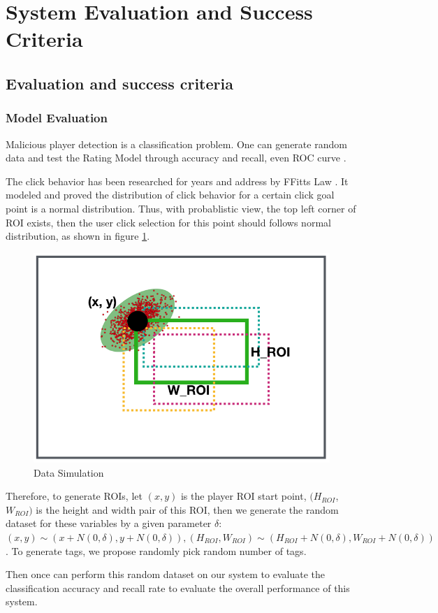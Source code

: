 \section{System Evaluation and Success Criteria}

\subsection{Evaluation and success criteria}
  \subsubsection{Model Evaluation}

  Malicious player detection is a classification problem. 
  One can generate random data and test the Rating Model through accuracy and recall, even ROC curve \cite{hanley1982meaning}.

  The click behavior has been researched for years and address by FFitts Law \cite{bi2013ffitts}.
  It modeled and proved the distribution of click behavior for a certain click goal point is a normal distribution.
  Thus, with probablistic view, the top left corner of ROI exists, then the user click selection 
  for this point should follows normal distribution, as shown in figure \ref{fig:evaluation}.

  \begin{figure}[htp]
  \centering
  \includegraphics[width=0.5\columnwidth]{figures/evaluation}
  \caption{Data Simulation}
  \label{fig:evaluation}
  \end{figure}

  Therefore, to generate ROIs, let $(x, y)$ is the player ROI start point,  $(H_{ROI}$, $W_{ROI})$ is the height
  and width pair of this ROI, then we generate the random dataset for these variables by a given
  parameter $\delta$: $(x, y) \sim (x+N(0, \delta), y+N(0, \delta)), (H_{ROI}, W_{ROI}) \sim (H_{ROI}+N(0, \delta), W_{ROI}+N(0, \delta))$.
  To generate tags, we propose randomly pick random number of tags.

  Then once can perform this random dataset on our system to evaluate the classification accuracy and recall rate to
  evaluate the overall performance of this system.

